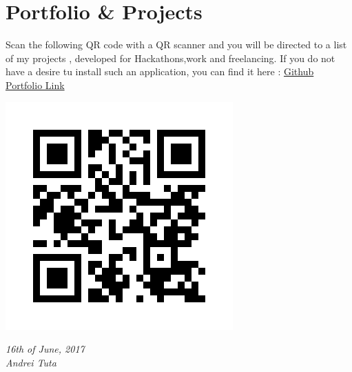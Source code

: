 \documentclass[]{friggeri-cv}
\begin{document}
\section{Portfolio \& Projects}
  \setlength{\parindent}{10ex}
    {Scan the following QR code with a QR scanner and you will be directed to a list of my projects , developed for Hackathons,work and freelancing.
    If you do not have a desire tu install such an application, you can find it here : \href{https://github.com/AndreiTuta/CV }{Github Portfolio Link} \n }\par
\includegraphics[scale=0.30]{img/static_qr_code_without_logo.jpg}
\n

\begin{flushleft}
\emph{16th of June, 2017}
\\
\emph{Andrei Tuta}
\end{flushleft}
\end{document}
